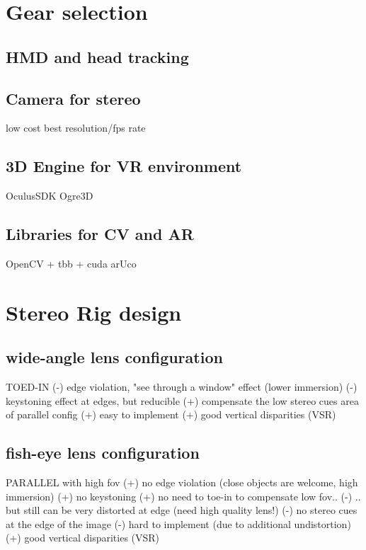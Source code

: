 


\section{Gear selection}

\subsection{HMD and head tracking}

\subsection{Camera for stereo}
low cost
best resolution/fps rate

\subsection{3D Engine for VR environment}
OculusSDK
Ogre3D

\subsection{Libraries for CV and AR}
OpenCV + tbb + cuda
arUco




\section{Stereo Rig design}

\subsection{wide-angle lens configuration}
TOED-IN
(-) edge violation, "see through a window" effect (lower immersion)
(-) keystoning effect at edges, but reducible
(+) compensate the low stereo cues area of parallel config
(+) easy to implement
(+) good vertical disparities (VSR)

\subsection{fish-eye lens configuration}
PARALLEL with high fov
(+) no edge violation (close objects are welcome, high immersion)
(+) no keystoning
(+) no need to toe-in to compensate low fov..
(-) .. but still can be very distorted at edge (need high quality lens!)
(-) no stereo cues at the edge of the image
(-) hard to implement (due to additional undistortion)
(+) good vertical disparities (VSR)

